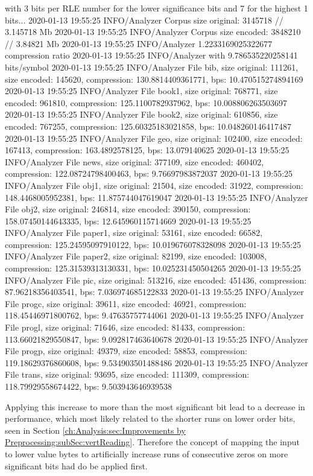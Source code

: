 {with 3 bits per RLE number for the lower significance bits and 7 for the highest 1 bits... 
2020-01-13 19:55:25 INFO/Analyzer  Corpus size original: 3145718 // 3.145718 Mb  
2020-01-13 19:55:25 INFO/Analyzer  Corpus size encoded: 3848210 // 3.84821 Mb  
2020-01-13 19:55:25 INFO/Analyzer  1.2233169025322677 compression ratio  
2020-01-13 19:55:25 INFO/Analyzer  with 9.786535220258141 bits/symbol  
2020-01-13 19:55:25 INFO/Analyzer  File bib, size original: 111261, size encoded: 145620, compression: 130.8814409361771, bps: 10.470515274894169  
2020-01-13 19:55:25 INFO/Analyzer  File book1, size original: 768771, size encoded: 961810, compression: 125.1100782937962, bps: 10.008806263503697  
2020-01-13 19:55:25 INFO/Analyzer  File book2, size original: 610856, size encoded: 767255, compression: 125.60325183021858, bps: 10.048260146417487  
2020-01-13 19:55:25 INFO/Analyzer  File geo, size original: 102400, size encoded: 167413, compression: 163.4892578125, bps: 13.079140625  
2020-01-13 19:55:25 INFO/Analyzer  File news, size original: 377109, size encoded: 460402, compression: 122.08724798400463, bps: 9.76697983872037  
2020-01-13 19:55:25 INFO/Analyzer  File obj1, size original: 21504, size encoded: 31922, compression: 148.4468005952381, bps: 11.875744047619047  
2020-01-13 19:55:25 INFO/Analyzer  File obj2, size original: 246814, size encoded: 390150, compression: 158.07450144643335, bps: 12.645960115714669  
2020-01-13 19:55:25 INFO/Analyzer  File paper1, size original: 53161, size encoded: 66582, compression: 125.24595097910122, bps: 10.019676078328098  
2020-01-13 19:55:25 INFO/Analyzer  File paper2, size original: 82199, size encoded: 103008, compression: 125.31539313130331, bps: 10.025231450504265  
2020-01-13 19:55:25 INFO/Analyzer  File pic, size original: 513216, size encoded: 451436, compression: 87.96218356403541, bps: 7.036974685122833  
2020-01-13 19:55:25 INFO/Analyzer  File progc, size original: 39611, size encoded: 46921, compression: 118.45446971800762, bps: 9.47635757744061  
2020-01-13 19:55:25 INFO/Analyzer  File progl, size original: 71646, size encoded: 81433, compression: 113.66021829550847, bps: 9.092817463640678  
2020-01-13 19:55:25 INFO/Analyzer  File progp, size original: 49379, size encoded: 58853, compression: 119.18629376860608, bps: 9.534903501488486  
2020-01-13 19:55:25 INFO/Analyzer  File trans, size original: 93695, size encoded: 111309, compression: 118.79929558674422, bps: 9.503943646939538  

}
\par{
Applying this increase to more than the most significant bit lead to a decrease in performance, which most likely related to the shorter runs on lower order bits, seen in Section \ref{ch:Analysis:sec:Improvements by Preprocessing:subSec:vertReading}. Therefore the concept of mapping the input to lower value bytes to artificially increase runs of consecutive zeros on more significant bits had do be applied first.
}

